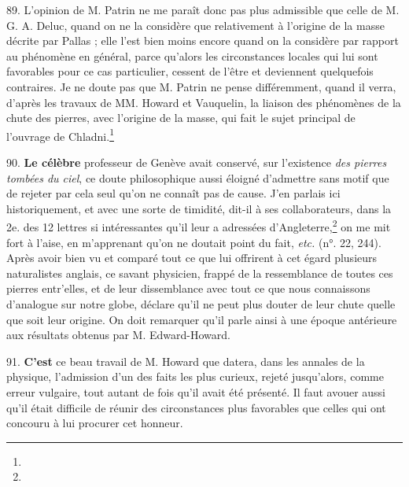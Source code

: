 \documentclass[a4paper, 11pt, oneside, polutonikogreek, french]{article}
\begin{document}
89. L'opinion de M. Patrin ne me paraît donc pas plus admissible que celle de M. G. A. Deluc, quand on ne la considère que relativement à l'origine de la masse décrite par Pallas ; elle l'est bien moins encore quand on la considère par rapport au phénomène en général, parce qu'alors les circonstances locales qui lui sont favorables pour ce cas particulier, cessent de l'être et deviennent quelquefois contraires. Je ne doute pas que M. Patrin ne pense différemment, quand il verra, d'après les travaux de MM. Howard et Vauquelin, la liaison des phénomènes de la chute des pierres, avec l'origine de la masse, qui fait le sujet principal de l'ouvrage de Chladni.\footnote{}

90. \textbf{Le célèbre} professeur de Genève avait conservé, sur l'existence \emph{des pierres tombées du ciel}, ce doute philosophique aussi éloigné d'admettre sans motif que de rejeter par cela seul qu'on ne connaît pas de cause. \og J'en parlais ici historiquement, et avec une sorte de timidité, dit-il à ses collaborateurs, dans la 2e. des 12 lettres si intéressantes qu'il leur a adressées d'Angleterre,\footnote{} on me mit fort à l'aise, en m'apprenant qu'on ne doutait point du fait, \emph{etc.} (n°. 22, 244). \fg Après avoir bien vu et comparé tout ce que lui offrirent à cet égard plusieurs naturalistes anglais, ce savant physicien, frappé de la ressemblance de toutes ces pierres entr'elles, et de leur dissemblance avec tout ce que nous connaissons d'analogue sur notre globe, déclare qu'il ne peut plus douter de leur chute quelle que soit leur origine. On doit remarquer qu'il parle ainsi à une époque antérieure aux résultats obtenus par M. Edward-Howard.

91. \textbf{C'est} ce beau travail de M. Howard que datera, dans les annales de la physique, l'admission d'un des faits les plus curieux, rejeté jusqu'alors, comme erreur vulgaire, tout autant de fois qu'il avait été présenté. Il faut avouer aussi qu'il était difficile de réunir des circonstances plus favorables que celles qui ont concouru à lui procurer cet honneur.
\end{document}
